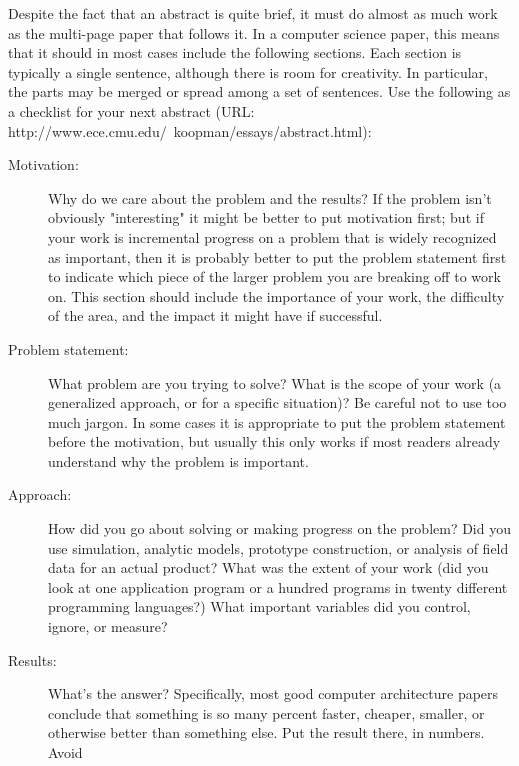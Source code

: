 

Despite the fact that an abstract is quite brief, it must do almost as much
work as the multi-page paper that follows it. In a computer science paper, this
means that it should in most cases include the following sections. Each section
is typically a single sentence, although there is room for creativity. In
particular, the parts may be merged or spread among a set of sentences. Use the
following as a checklist for your next abstract (URL:
http://www.ece.cmu.edu/~koopman/essays/abstract.html):

\begin{description}
  \item[Motivation:] Why do we care about the problem and the results? If the problem
        isn't obviously "interesting" it might be better to put motivation first; but
        if your work is incremental progress on a problem that is widely recognized as
        important, then it is probably better to put the problem statement first to
        indicate which piece of the larger problem you are breaking off to work on.
        This section should include the importance of your work, the difficulty of the
        area, and the impact it might have if successful.
  \item[Problem statement:] What problem are you trying to solve? What is the scope of
        your work (a generalized approach, or for a specific situation)? Be careful not
        to use too much jargon. In some cases it is appropriate to put the problem
        statement before the motivation, but usually this only works if most readers
        already understand why the problem is important.
  \item[Approach:] How did you go about solving or making progress on the problem? Did
        you use simulation, analytic models, prototype construction, or analysis of
        field data for an actual product? What was the extent of your work (did you
        look at one application program or a hundred programs in twenty different
        programming languages?) What important variables did you control, ignore, or
        measure?
  \item[Results:] What's the answer? Specifically, most good computer architecture
        papers conclude that something is so many percent faster, cheaper, smaller, or
        otherwise better than something else. Put the result there, in numbers. Avoid

\end{description}
